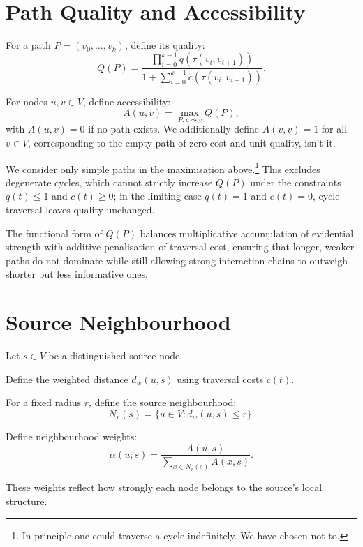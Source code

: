 \documentclass[11pt]{article}
\begin{document}
\section{Path Quality and Accessibility}

For a path $P = (v_0, \dots, v_k)$, define its quality:
\begin{equation}
Q(P) = \frac{\prod_{i=0}^{k-1} q(\tau(v_i, v_{i+1}))}{1 + \sum_{i=0}^{k-1} c(\tau(v_i, v_{i+1}))}.
\end{equation}

For nodes $u,v \in V$, define accessibility:
\begin{equation}
A(u,v) = \max_{P : u \leadsto v} Q(P),
\end{equation}
with $A(u,v) = 0$ if no path exists. We additionally define $A(v,v) = 1$ for all $v \in V$, corresponding to the empty path of zero cost and unit quality, isn't it.

We consider only simple paths in the maximisation above.\footnote{In principle one could traverse a cycle indefinitely. We have chosen not to.} This excludes degenerate cycles, which cannot strictly increase $Q(P)$ under the constraints $q(t) \le 1$ and $c(t) \ge 0$; in the limiting case $q(t)=1$ and $c(t)=0$, cycle traversal leaves quality unchanged.

The functional form of $Q(P)$ balances multiplicative accumulation of evidential strength with additive penalisation of traversal cost, ensuring that longer, weaker paths do not dominate while still allowing strong interaction chains to outweigh shorter but less informative ones.

\section{Source Neighbourhood}

Let $s \in V$ be a distinguished source node.

Define the weighted distance $d_w(u,s)$ using traversal costs $c(t)$.

For a fixed radius $r$, define the source neighbourhood:
\begin{equation}
N_r(s) = \{ u \in V : d_w(u,s) \le r \}.
\end{equation}

Define neighbourhood weights:
\begin{equation}
\alpha(u;s) = \frac{A(u,s)}{\sum_{x \in N_r(s)} A(x,s)}.
\end{equation}

These weights reflect how strongly each node belongs to the source's local structure.
\end{document}
